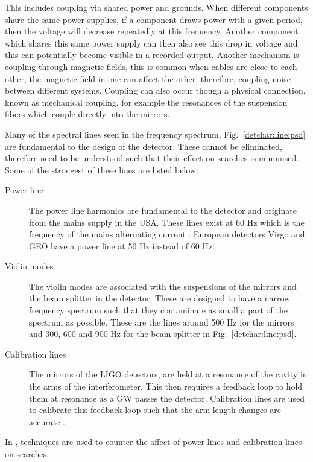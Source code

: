 This includes coupling via shared power and grounds. 
When different components share the same power supplies, if a component draws power with a given period, then the voltage will decrease repeatedly at this frequency. 
Another component which shares this same power supply can then also see this drop in voltage and this can potentially become visible in a recorded output. 
Another mechanism is coupling through magnetic fields, this is common when cables are close to each other, the magnetic field in one can affect the other, therefore, coupling noise between different systems.
Coupling can also occur though a physical connection, known as mechanical coupling, for example the resonances of the suspension fibers which couple directly into the mirrors.

%

Many of the spectral lines seen in the frequency spectrum, Fig.~\ref{detchar:line:psd} are fundamental to the design of the detector. 
These cannot be eliminated, therefore need to be understood such that their effect on searches is minimised.
Some of the strongest of these lines are listed below:
\begin{description}
	\item[Power line] The power line harmonics are fundamental to the detector and originate from the mains supply in the USA. These lines exist at 60 Hz which is the frequency of the mains alternating current \citep{aasi2015CharacterizationLIGO}. European detectors Virgo and GEO have a power line at 50 Hz instead of 60 Hz.
	
	\item[Violin modes] The violin modes are associated with the suspensions of the mirrors and the beam splitter in the detector. These are designed to have a narrow frequency spectrum such that they contaminate as small a part of the spectrum as possible. These are the lines around 500 Hz for the mirrors and 300, 600 and 900 Hz for the beam-splitter \citep{GWOpen} in Fig.~\ref{detchar:line:psd}.
	
	\item[Calibration lines] The mirrors of the \gls{LIGO} detectors, are held at a resonance of the cavity in the arms of the interferometer. This then requires a feedback loop to hold them at resonance as a \gls{GW} passes the detector. Calibration lines are used to calibrate this feedback loop such that the arm length changes are accurate \citep{tuyenbayev2016ImprovingLIGO,coughlin2010NoiseLine}.
\end{description}
In \citep{davis2019ImprovingSensitivity}, techniques are used to counter the affect of power lines and calibration lines on searches. 

